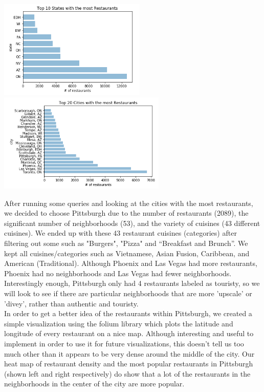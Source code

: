 \documentclass{neu_handout}
\begin{document}
\begin{center}
\includegraphics[width=70mm,scale=0.5]{states}
\includegraphics[width=80mm,scale=0.5]{cities}
\end{center}
   
After running some queries and looking at the cities with the most restaurants, we decided to choose Pittsburgh due to the number of restaurants (2089), the significant number of neighborhoods (53), and the variety of cuisines (43 different cuisines). We ended up with these 43 restaurant
cuisines (categories) after filtering out some such as "Burgers", "Pizza" and “Breakfast and Brunch”. We kept all cuisines/categories such as Vietnamese, Asian Fusion, Caribbean, and American (Traditional). Although Phoenix and Las Vegas had more restaurants, Phoenix had no neighborhoods and Las Vegas had fewer neighborhoods. Interestingly enough, Pittsburgh only had 4 restaurants labeled as touristy, so we will look to see if there are particular neighborhoods that are more 'upscale' or 'divey', rather than authentic and touristy.\\

In order to get a better idea of the restaurants within Pittsburgh, we created a simple visualization using the folium library which plots the latitude and longitude of every restaurant on a nice map. Although interesting and useful to implement in order to use it for future visualizations, this doesn't tell us too much other than it appears to be very dense around the middle of the city. Our heat map of restaurant density and the most popular restaurants in Pittsburgh (shown left and right respectively) do show that a lot of the restaurants in the neighborhoods in the center of the city are more popular.
\end{document}
